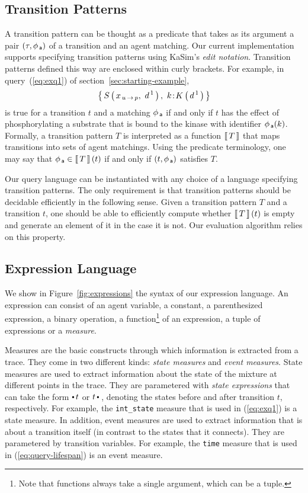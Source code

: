\documentclass[runningheads]{llncs}
\begin{document}
\subsection{Transition Patterns}\label{subsec:tpats-language}

A transition pattern can be thought as a predicate that takes as its
argument a pair $(\tau, \phi_{\,\textsf{a}})$ of a transition and an agent
matching. Our current implementation supports specifying transition
patterns using KaSim's \emph{edit notation}. Transition patterns
defined this way are enclosed within curly brackets.  For example, in
query~(\ref{eq:exq1}) of section~\ref{sec:starting-example},
\[ \Set{ \AG{S}{x_{\Trans{u}{p}},\ d^{\,1}},\ \iAG{k}{K}{d^{\,1}} } \]
is true for a transition $t$ and a matching $\phi_{\,\textsf{a}}$ if and only
if $t$ has the effect of phosphorylating a substrate that is bound to
the kinase with identifier $\phi_{\,\textsf{a}}(k)$. Formally, a transition
pattern $T$ is interpreted as a function $\left\llbracket \, T \, \right\rrbracket$ that maps
transitions into sets of agent matchings. Using the predicate
terminology, one may say that $\phi_{\,\textsf{a}} \in \left\llbracket \, T \, \right\rrbracket(t)$ if and only
if $(t, \phi_{\,\textsf{a}})$ satisfies $T$.

Our query language can be instantiated with any choice of a language
specifying transition patterns. The only requirement is that
transition patterns should be {decidable efficiently} in the following
sense. Given a transition pattern $T$ and a transition $t$, one should
be able to efficiently compute whether $\left\llbracket \, T \, \right\rrbracket(t)$ is empty and
generate an element of it in the case it is not. Our evaluation
algorithm relies on this property.


\subsection{Expression Language}\label{subsec:expr-language}

We show in Figure~\ref{fig:expressions} the syntax of our expression
language. An expression can consist of an agent variable, a constant,
a parenthesized expression, a binary operation, a
function\footnote{Note that functions always take a single argument,
  which can be a tuple.} of an expression, a tuple of expressions or a
\emph{measure}.

Measures are the basic constructs through which information is
extracted from a trace. They come in two different kinds: \emph{state
  measures} and \emph{event measures}. State measures are used to
extract information about the state of the mixture at different points
in the trace. They are parametered with \emph{state expressions} that
can take the form $\StateBefore{t}$ or $\StateAfter{t}\,$, denoting
the states before and after transition $t$, respectively. For example,
the \texttt{int\_state} measure that is used in (\ref{eq:exq1}) is a
state measure. In addition, event measures are used to extract
information that is about a transition itself (in contrast to the
states that it connects). They are parametered by transition
variables. For example, the \texttt{time} measure that is used in
(\ref{eq:query-lifespan}) is an event measure.
\end{document}
